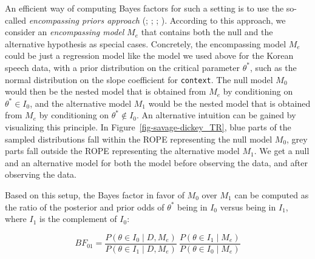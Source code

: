 \documentclass[
  doc,
  floatsintext,
  longtable,
  nolmodern,
  notxfonts,
  notimes,
  colorlinks=true,linkcolor=blue,citecolor=blue,urlcolor=blue]{apa7}
\begin{document}
An efficient way of computing Bayes factors for such a setting is to use
the so-called \emph{encompassing priors approach}
(;
; ;
). According to this approach, we consider an \emph{encompassing
model} \(M_e\) that contains both the null and the alternative
hypothesis as special cases. Concretely, the encompassing model \(M_e\)
could be just a regression model like the model we used above for the
Korean speech data, with a prior distribution on the critical parameter
\(\theta^*\), such as the normal distribution on the slope coefficient
for \texttt{context}. The null model \(M_0\) would then be the nested
model that is obtained from \(M_e\) by conditioning on
\(\theta^* \in I_0\), and the alternative model \(M_1\) would be the
nested model that is obtained from \(M_e\) by conditioning on
\(\theta^* \not \in I_0\). An alternative intuition can be gained by
visualizing this principle. In Figure~\ref{fig-savage-dickey_TR}, blue
parts of the sampled distributions fall within the ROPE representing the
null model \(M_0\), grey parts fall outside the ROPE representing the
alternative model \(M_1\). We get a null and an alternative model for
both the model before observing the data, and after observing the data.

Based on this setup, the Bayes factor in favor of \(M_0\) over \(M_1\)
can be computed as the ratio of the posterior and prior odds of
\(\theta^*\) being in \(I_0\) versus being in \(I_1\), where \(I_1\) is
the complement of \(I_0\):

\[
BF_{01} = \frac{P(\theta \in I_{0} \mid D, M_{e})}{P(\theta \in I_{1} \mid D, M_{e})} \ \frac{P(\theta \in I_{1} \mid  M_{e})}{P(\theta \in I_{0} \mid M_{e})}
\]
\end{document}

